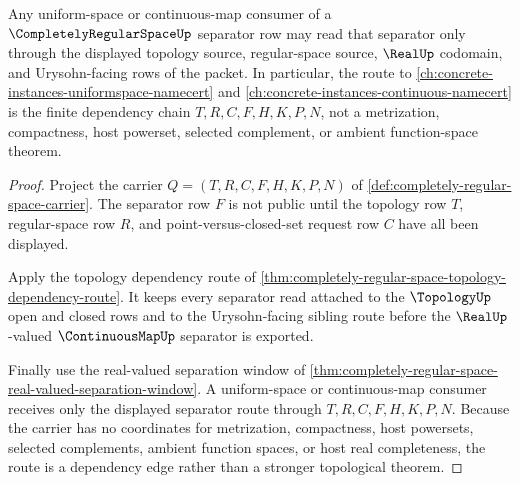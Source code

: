 \begin{theorem}
\label{thm:completely-regular-space-uniformity-forward-route}
Any uniform-space or continuous-map consumer of a $\CompletelyRegularSpaceUp$ separator row may read that separator only through the displayed topology source, regular-space source, $\RealUp$ codomain, and Urysohn-facing rows of the packet. In particular, the route to \autoref{ch:concrete-instances-uniformspace-namecert} and \autoref{ch:concrete-instances-continuous-namecert} is the finite dependency chain $T,R,C,F,H,K,P,N$, not a metrization, compactness, host powerset, selected complement, or ambient function-space theorem.
\end{theorem}
\begin{proof}
Project the carrier $Q=(T,R,C,F,H,K,P,N)$ of \autoref{def:completely-regular-space-carrier}. The separator row $F$ is not public until the topology row $T$, regular-space row $R$, and point-versus-closed-set request row $C$ have all been displayed.

Apply the topology dependency route of \autoref{thm:completely-regular-space-topology-dependency-route}. It keeps every separator read attached to the $\TopologyUp$ open and closed rows and to the Urysohn-facing sibling route before the $\RealUp$-valued $\ContinuousMapUp$ separator is exported.

Finally use the real-valued separation window of \autoref{thm:completely-regular-space-real-valued-separation-window}. A uniform-space or continuous-map consumer receives only the displayed separator route through $T,R,C,F,H,K,P,N$. Because the carrier has no coordinates for metrization, compactness, host powersets, selected complements, ambient function spaces, or host real completeness, the route is a dependency edge rather than a stronger topological theorem.
\end{proof}

